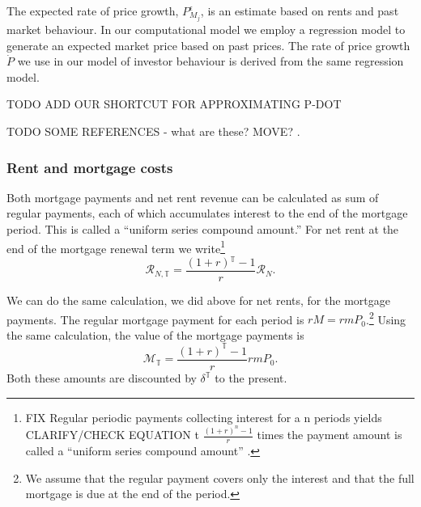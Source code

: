 {%


The expected rate of price growth, $P_{M_j}^\epsilon$, is an estimate based on rents and past market behaviour. In our computational model we employ a regression model to generate an \gls{expected market price} based on past prices. The rate of price growth $\dot P$ we use in our model of investor behaviour is derived from the same regression model.

TODO ADD OUR SHORTCUT FOR APPROXIMATING P-DOT

TODO SOME REFERENCES - what are these? MOVE? \cite{anselinModernSpatialEconometrics2014, gelmanDataAnalysisUsing2006}.


 
\subsubsection{Rent and mortgage costs}
Both mortgage payments and net rent revenue can be calculated as sum  of regular payments, each of which accumulates interest to the end of the mortgage period. This is called a ``uniform series compound amount.'' For net rent at the end of the mortgage renewal term we write\footnote{FIX Regular periodic payments collecting interest for a n periods yields CLARIFY/CHECK EQUATION t  $\frac{(1+r)^n-1}{r}$ times the payment amount is called a ``uniform series compound amount'' \cite{GET_SOURCE}.%
} 
\begin{equation}
\mathcal{R}_{N, \mathbb{T}}= \frac{(1+r)\mathbb{^\mathbb{T}}-1}{r}\mathcal{R}_N.     
\end{equation}

We can do the same calculation, we did above for net rents, for the mortgage payments.
The regular mortgage payment for each period is $rM=rmP_0$.\footnote{We assume that the regular payment covers only the interest and that the full mortgage is due at the end of the period.} Using the same calculation, the value of the mortgage payments is %
\begin{equation}
\mathcal{M}_{\mathbb{T}} = \frac{(1+r)^\mathbb{T}-1}{r}rmP_0. 
\end{equation}
Both these amounts are discounted by $\delta^\mathbb{T}$ to the present. %
 
}
